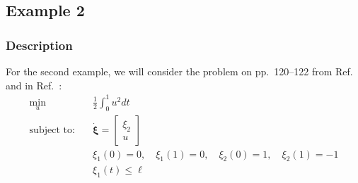 \subsection{Example 2} \label{sec:ch5:example2}

\subsubsection{Description}
For the second example, we will consider the problem on pp.~120--122 from Ref.~\cite{Bryson1975a} and in Ref.~\cite{Bryson1963a}:
\begin{subequations}%
\begin{align}
\min_{u} \quad & \frac{1}{2}\int_{0}^{1} u^2 dt \\
\text{subject to:} \quad  & \dot{\bm{\xi}} = \begin{bmatrix} \xi_2 \\ u \end{bmatrix} \\
& \xi_1(0) = 0, \quad \xi_1(1) = 0, \quad \xi_2(0) = 1, \quad \xi_2(1) = -1 \\
& \xi_1(t) \leq \ell
\end{align}
\end{subequations}%

